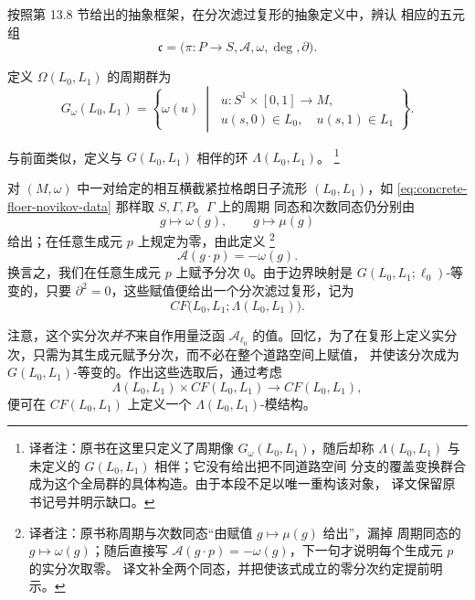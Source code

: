 按照第 13.8 节给出的\personUsher{}抽象框架，在分次滤过\personFloer{}复形的抽象定义中，辨认
相应的五元组
\[
  \mathfrak c
  =
  \bigl(\pi:P\to S,\mathcal A,\omega,\operatorname{deg},\partial\bigr).
\]

\begin{definition}
\label{def:global-lagrangian-period-group}
定义 $\Omega(L_0,L_1)$ 的周期群为
\[
  G_\omega(L_0,L_1)
  =
  \left\{
    \omega(u)
    \ \middle|\
    \begin{gathered}
      u:S^1\times[0,1]\to M,\\
      u(s,0)\in L_0,\quad u(s,1)\in L_1
    \end{gathered}
  \right\}.
\]
\end{definition}

与前面类似，定义与 $G(L_0,L_1)$ 相伴的\personNovikov{}环
$\Lambda(L_0,L_1)$。
\footnote{译者注：原书在这里只定义了周期像 $G_\omega(L_0,L_1)$，随后却称
$\Lambda(L_0,L_1)$ 与未定义的 $G(L_0,L_1)$ 相伴；它没有给出把不同道路空间
分支的覆盖变换群合成为这个全局群的具体构造。由于本段不足以唯一重构该对象，
译文保留原书记号并明示缺口。}

对 $(M,\omega)$ 中一对给定的相互横截紧拉格朗日子流形 $(L_0,L_1)$，如
\eqref{eq:concrete-floer-novikov-data} 那样取 $S,\Gamma,P$。$\Gamma$ 上的周期
同态和次数同态仍分别由
\[
  g\longmapsto\omega(g),
  \qquad
  g\longmapsto\mu(g)
\]
给出；在任意生成元 $p$ 上规定\termRealGrading{}为零，由此定义
\footnote{译者注：原书称周期与次数同态“由赋值 $g\mapsto\mu(g)$ 给出”，漏掉
周期同态的 $g\mapsto\omega(g)$；随后直接写
$\mathcal A(g\cdot p)=-\omega(g)$，下一句才说明每个生成元 $p$ 的实分次取零。
译文补全两个同态，并把使该式成立的零分次约定提前明示。}
\begin{equation}
  \mathcal A(g\cdot p)=-\omega(g).
\label{eq:global-real-grading}
\end{equation}
换言之，我们在任意生成元 $p$ 上赋予分次 $0$。由于\personFloer{}边界映射是
$G(L_0,L_1;\ell_0)$-等变的，只要 $\partial^2=0$，这些赋值便给出一个分次滤过\personFloer{}复形，记为
\[
  CF\bigl(L_0,L_1;\Lambda(L_0,L_1)\bigr).
\]

注意，这个实分次\emph{并不}来自作用量泛函 $\mathcal A_{\ell_0}$ 的值。回忆，为了在\personFloer{}复形上定义实分次，只需为其生成元赋予分次，而不必在整个道路空间上赋值，
并使该分次成为 $G(L_0,L_1)$-等变的。作出这些选取后，通过考虑\termConvolutionProduct{}
\[
  \Lambda(L_0,L_1)\times CF(L_0,L_1)
  \longrightarrow CF(L_0,L_1),
\]
便可在 $CF(L_0,L_1)$ 上定义一个 $\Lambda(L_0,L_1)$-模结构。
